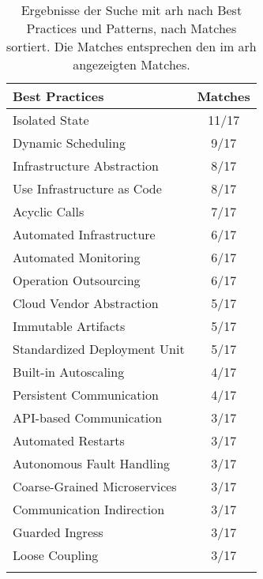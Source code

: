 \begin{table}[!htb]
\begin{minipage}{.5\linewidth}
    \centering
    \begin{tabular}{p{5cm} c}
      \toprule
      \textbf{Best Practices} & \textbf{Matches} \\ \midrule
      Isolated State                        & 11/17 \\ \hline
      Dynamic Scheduling                    & 9/17 \\ \hline
      Infrastructure Abstraction            & 8/17 \\ \hline
      Use Infrastructure as Code            & 8/17 \\ \hline
      Acyclic Calls                         & 7/17 \\ \hline
      Automated Infrastructure              & 6/17 \\ \hline
      Automated Monitoring                  & 6/17 \\ \hline
      Operation Outsourcing                 & 6/17 \\ \hline
      Cloud Vendor Abstraction              & 5/17 \\ \hline
      Immutable Artifacts                   & 5/17 \\ \hline
      Standardized Deployment Unit          & 5/17 \\ \hline
      Built-in Autoscaling                  & 4/17 \\ \hline
      Persistent Communication              & 4/17 \\ \hline
      API-based Communication               & 3/17 \\ \hline
      Automated Restarts                    & 3/17 \\ \hline
      Autonomous Fault Handling             & 3/17 \\ \hline
      Coarse-Grained Microservices          & 3/17 \\ \hline
      Communication Indirection             & 3/17 \\ \hline
      Guarded Ingress                       & 3/17 \\ \hline
      Loose Coupling                        & 3/17 \\ \bottomrule
      \\
    \end{tabular}
  \end{minipage}

  \caption[Best Practices und Patterns Suchergebnisse]{
		Ergebnisse der Suche mit \gls{arh} nach Best Practices und Patterns, nach Matches sortiert.
		Die Matches entsprechen den im \gls{arh} angezeigten Matches.
	}
	\label{tab:phase3-search-results}
\end{table}
